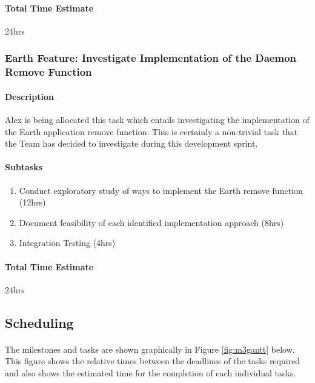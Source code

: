 \documentclass[10pt,a4,oneside]{article}
\begin{document}
\paragraph{Total Time Estimate} 24hrs
 
\subsubsection{Earth Feature: Investigate Implementation of the Daemon Remove Function}

\paragraph{Description}
Alex is being allocated this task which entails investigating the implementation of the 
Earth application remove function. This is certainly a non-trivial task that the Team 
has decided to investigate during this development sprint.

\paragraph{Subtasks}
\noindent
\begin{enumerate}
\item Conduct exploratory study of ways to implement the Earth remove function (12hrs)
\item Document feasibility of each identified implementation approach (8hrs)
\item Integration Testing (4hrs)
\end{enumerate}

\paragraph{Total Time Estimate} 24hrs

\newpage
 
\subsection{Scheduling}

\paragraph{} 
The milestones and tasks are shown graphically in Figure \ref{fig:m3gantt} below. 
This figure shows the relative times between the deadlines of the tasks required 
and also shows the estimated time for the completion of each individual tasks.
 
\end{document}
